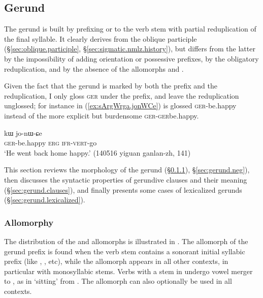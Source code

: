 \subsection{Gerund} \label{sec:gerund}
The gerund is built by prefixing  or  to the verb stem with partial reduplication of the final syllable. It clearly derives from the oblique participle (§\ref{sec:oblique.participle}, §\ref{sec:sigmatic.nmlz.history}), but differs from the latter by the impossibility of adding orientation or possessive prefixes, by the obligatory reduplication, and by the absence of the allomorphs  and . 

Given the fact that the gerund is marked by both the prefix  and the reduplication, I only gloss \textsc{ger} under the prefix, and leave the reduplication unglossed; for instance in (\ref{ex:sArgWrga.jonWCe})  is glossed \textsc{ger}-be.happy instead of the more explicit but burdensome \textsc{ger}-\textsc{ger}\redp{}be.happy.

\begin{exe}
\ex \label{ex:sArgWrga.jonWCe}
 kɯ jo-nɯ-ɕe \\
\textsc{ger}-be.happy \textsc{erg} \textsc{ifr}-\textsc{vert}-go \\
\glt `He went back home happy.' (140516 yiguan ganlan-zh, 141)
\end{exe}

This section reviews the morphology of the gerund (§\ref{sec:gerund.allomorphs}), §\ref{sec:gerund.neg}), then discusses the syntactic properties of gerundive clauses and their meaning (§\ref{sec:gerund.clauses}), and finally presents some cases of lexicalized gerunds (§\ref{sec:gerund.lexicalized}).


\subsubsection{Allomorphy} \label{sec:gerund.allomorphs}
The distribution of the  and  allomorphs is illustrated in . The  allomorph of the gerund prefix is found when the verb stem contains a sonorant initial syllabic prefix (like , ,  etc), while the  allomorph appears in all other contexts, in particular with monosyllabic stems. Verbs with a stem in  undergo vowel merger  to , as in  `sitting' from . The  allomorph can also optionally be used in all contexts.

